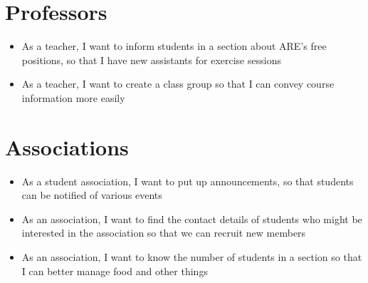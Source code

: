 \documentclass[11pt]{article}
\begin{document}
\section{Professors}
\label{sec:orgf5af649}
\begin{itemize}
\item As a teacher, I want to inform students in a section about ARE's free positions, so that I have new assistants for exercise sessions
\item As a teacher, I want to create a class group so that I can convey course information more easily
\end{itemize}
\section{Associations}
\label{sec:org09571d9}
\begin{itemize}
\item As a student association, I want to put up announcements, so that students can be notified of various events
\item As an association, I want to find the contact details of students who might be interested in the association so that we can recruit new members
\item As an association, I want to know the number of students in a section so that I can better manage food and other things
\end{itemize}
\end{document}
